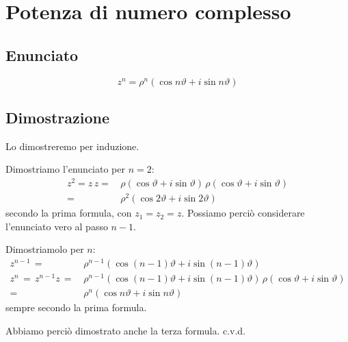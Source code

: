 \documentclass[../../analisi1]{subfiles}
\begin{document}
        \newpage

        \section*{Potenza di numero complesso}

            \subsection*{Enunciato}

                \[ z^n = \rho^n (\cos n\vartheta +i\sin n\vartheta)\]

            \subsection*{Dimostrazione}

                Lo dimostreremo per induzione.

                Dimostriamo l'enunciato per \(n = 2\):
                \begin{align*}
                    z^2 = z \, z =& \, \rho(\cos\vartheta+i\sin\vartheta) \, \rho(\cos\vartheta+i\sin\vartheta)\\
                                      =& \, \rho^2(\cos2\vartheta + i\sin2\vartheta)
                \end{align*}
                secondo la prima formula, con \(z_1 = z_2 = z\).
                Possiamo perciò considerare l'enunciato vero al passo \(n - 1\).

                Dimostriamolo per \(n\):
                \begin{align*}
                    z^{n - 1} \, =& \, \rho^{n - 1} (\cos (n - 1)\vartheta + i \sin (n - 1)\vartheta)\\
                    z^{n} \, = \, z^{n - 1} z \, =& \, \rho^{n - 1} (\cos (n - 1)\vartheta + i \sin (n - 1)\vartheta) \, \rho(\cos \vartheta + i \sin \vartheta) \\
                                               =& \, \rho^n (\cos n\vartheta + i\sin n\vartheta)
                \end{align*}
                sempre secondo la prima formula.

                Abbiamo perciò dimostrato anche la terza formula. c.v.d.
            
\end{document}
